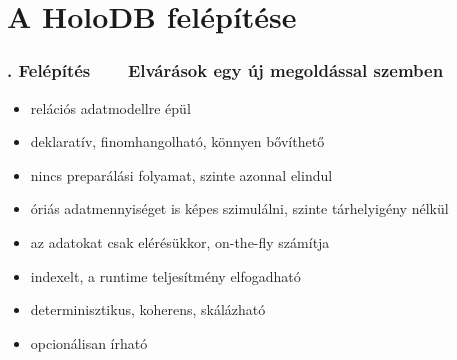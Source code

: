 \documentclass[
    aspectratio=169,
]{beamer}
\newcommand{\slidetitle}[2]{\frametitle{{\small #1 ~ \ding{226} ~ } \normalsize \textbf{#2} }}
\begin{document}
\section{A HoloDB felépítése}
\def\sectionshorttitle{. Felépítés}

\begin{frame}
    \slidetitle{\sectionshorttitle}{Elvárások egy új megoldással szemben}
    
    \begin{itemize}
        \setlength\itemsep{0.5em}
        \item {\color{red}relációs adatmodell}re épül
        \item {\color{red}deklaratív}, finomhangolható, könnyen bővíthető
        \item {\color{red}nincs preparálás}i folyamat, szinte azonnal elindul
        \item óriás adatmennyiséget is képes szimulálni, szinte {\color{red}tárhelyigény nélkül}
        \item az adatokat csak elérésükkor, on-the-fly számítja
        \item indexelt, a runtime teljesítmény elfogadható
        \item determinisztikus, {\color{red}koherens}, skálázható
        \item opcionálisan írható
    \end{itemize}
\end{frame}
\end{document}
